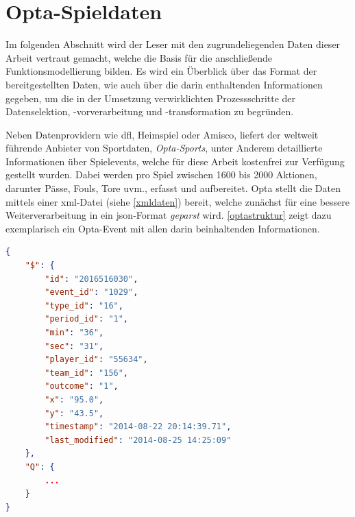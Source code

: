 \section{Opta-Spieldaten}
\label{opta}
Im folgenden Abschnitt wird der Leser mit den zugrundeliegenden Daten dieser Arbeit vertraut gemacht, welche die Basis für die anschließende Funktionsmodellierung bilden. Es wird ein Überblick über das Format der bereitgestellten Daten, wie auch über die darin enthaltenden Informationen gegeben, um die in der Umsetzung verwirklichten Prozessschritte der Datenselektion, -vorverarbeitung und \mbox{-transformation} zu begründen.

Neben Datenprovidern wie \gls{dfl}, Heimspiel oder Amisco, liefert der weltweit führende Anbieter von Sportdaten, \textit{Opta-Sports}, unter Anderem detaillierte Informationen über Spielevents, welche für diese Arbeit kostenfrei zur Verfügung gestellt wurden. Dabei werden pro Spiel zwischen 1600 bis 2000 Aktionen, darunter Pässe, Fouls, Tore uvm., erfasst und aufbereitet. Opta stellt die Daten mittels einer \gls{xml}-Datei (siehe \vref{xmldaten}) bereit, welche zunächst für eine bessere Weiterverarbeitung in ein \gls{json}-Format \textit{geparst} wird. \vref{optastruktur} zeigt dazu exemplarisch ein Opta-Event mit allen darin beinhaltenden Informationen.
\newline

\begin{lstlisting}[caption=\captionListingText,language=json,xleftmargin=5mm,label=optastruktur] 
{
	"$": {
		"id": "2016516030",
		"event_id": "1029",
		"type_id": "16",
		"period_id": "1",
		"min": "36",
		"sec": "31",
		"player_id": "55634",
		"team_id": "156",
		"outcome": "1",
		"x": "95.0",
		"y": "43.5",
		"timestamp": "2014-08-22 20:14:39.71",
		"last_modified": "2014-08-25 14:25:09"
	},
	"Q": {
	    ...
	}
}
\end{lstlisting}



